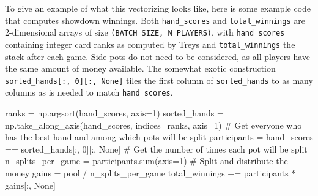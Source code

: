 To give an example of what this vectorizing looks like, here is some example code that computes showdown winnings. Both \verb{hand_scores{ and \verb{total_winnings{ are 2-dimensional arrays of size \verb{(BATCH_SIZE, N_PLAYERS){, with \verb{hand_scores{ containing integer card ranks as computed by Treys and \verb{total_winnings{ the stack after each game. Side pots do not need to be considered, as all players have the same amount of money available. The somewhat exotic construction \verb{sorted_hands[:, 0][:, None]{ tiles the first column of \verb{sorted_hands{ to as many columns as is needed to match \verb{hand_scores{.
\begin{code}
ranks = np.argsort(hand_scores, axis=1)
sorted_hands = np.take_along_axis(hand_scores, indices=ranks, axis=1)
# Get everyone who has the best hand and among which pots will be split
participants = hand_scores == sorted_hands[:, 0][:, None]
# Get the number of times each pot will be split
n_splits_per_game = participants.sum(axis=1)
# Split and distribute the money
gains = pool / n_splits_per_game
total_winnings += participants * gains[:, None]
\end{code}

